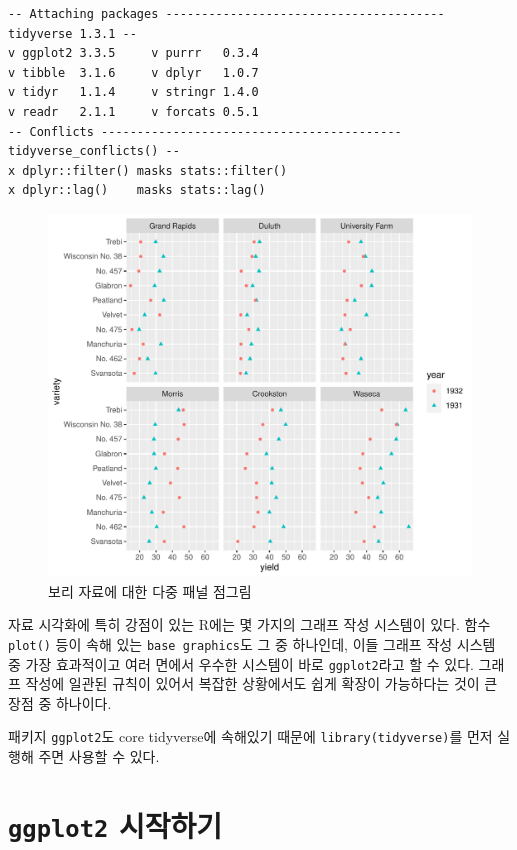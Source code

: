 \documentclass[
]{book}
\begin{document}
\begin{verbatim}
-- Attaching packages --------------------------------------- tidyverse 1.3.1 --
v ggplot2 3.3.5     v purrr   0.3.4
v tibble  3.1.6     v dplyr   1.0.7
v tidyr   1.1.4     v stringr 1.4.0
v readr   2.1.1     v forcats 0.5.1
-- Conflicts ------------------------------------------ tidyverse_conflicts() --
x dplyr::filter() masks stats::filter()
x dplyr::lag()    masks stats::lag()
\end{verbatim}

\begin{figure}
\centering
\includegraphics{_main_files/figure-latex/barely-1.pdf}
\caption{\label{fig:barely}보리 자료에 대한 다중 패널 점그림}
\end{figure}

자료 시각화에 특히 강점이 있는 R에는 몇 가지의 그래프 작성 시스템이 있다. 함수 \texttt{plot()} 등이 속해 있는
\texttt{base\ graphics}도 그 중 하나인데, 이들 그래프 작성 시스템 중 가장 효과적이고 여러 면에서 우수한 시스템이 바로 \texttt{ggplot2}라고 할 수 있다.
그래프 작성에 일관된 규칙이 있어서 복잡한 상황에서도 쉽게 확장이 가능하다는 것이 큰 장점 중 하나이다.

패키지 \texttt{ggplot2}도 core tidyverse에 속해있기 때문에 \texttt{library(tidyverse)}를 먼저 실행해 주면 사용할 수 있다.

\hypertarget{ggplot2-uxc2dcuxc791uxd558uxae30}{%
\section{\texorpdfstring{\texttt{ggplot2} 시작하기}{ggplot2 시작하기}}\label{ggplot2-uxc2dcuxc791uxd558uxae30}}
\end{document}
